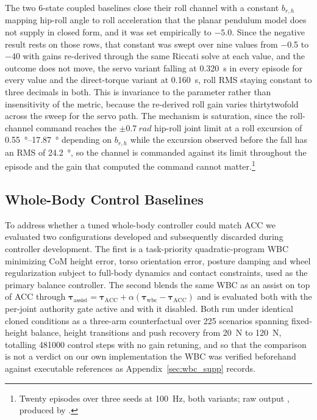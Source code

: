 \documentclass[a4paper,fleqn]{cas-dc}
\begin{document}
The two 6-state coupled baselines close their roll channel with a constant
$b_{r,h}$ mapping hip-roll angle to roll acceleration that the planar pendulum
model does not supply in closed form, and it was set empirically to $-5.0$. Since
the negative result rests on those rows, that constant was swept over nine values
from \num{-0.5} to \num{-40} with gains re-derived through the same Riccati solve
at each value, and the outcome does not move, the servo variant falling at
\SI{0.320}{s} in every episode for every value and the direct-torque variant at
\SI{0.160}{s}, roll RMS staying constant to three decimals in both. This is
invariance to the parameter rather than insensitivity of the metric, because the
re-derived roll gain varies thirtytwofold across the sweep for the servo path.
The mechanism is saturation, since the roll-channel command reaches the
$\pm\SI{0.7}{rad}$ hip-roll joint limit at a roll excursion of
\SIrange{0.55}{17.87}{\degree} depending on $b_{r,h}$ while the excursion
observed before the fall has an RMS of \SI{24.2}{\degree}, so the channel is
commanded against its limit throughout the episode and the gain that computed the
command cannot matter.\footnote{Twenty episodes over three seeds at \SI{100}{Hz},
both variants; raw output ,
produced by .}

\subsection{Whole-Body Control Baselines}
\label{sec:wbc}

To address whether a tuned whole-body controller could match ACC we evaluated two
configurations developed and subsequently discarded during controller
development. The first is a task-priority quadratic-program WBC minimizing CoM
height error, torso orientation error, posture damping and wheel regularization
subject to full-body dynamics and contact constraints, used as the primary
balance controller. The second blends the same WBC as an assist on top of ACC
through $\boldsymbol{\tau}_{\text{assist}} = \boldsymbol{\tau}_{\text{ACC}} +
\alpha(\boldsymbol{\tau}_{\text{wbc}} - \boldsymbol{\tau}_{\text{ACC}})$ and is
evaluated both with the per-joint authority gate active and with it disabled.
Both run under identical cloned conditions as a three-arm counterfactual over
\num{225} scenarios spanning fixed-height balance, height transitions and push
recovery from \SI{20}{N} to \SI{120}{N}, totalling \num{481000} control steps
with no gain retuning, and so that the comparison is not a verdict on our own
implementation the WBC was verified beforehand against executable references as
Appendix~\ref{sec:wbc_supp} records.
\end{document}
